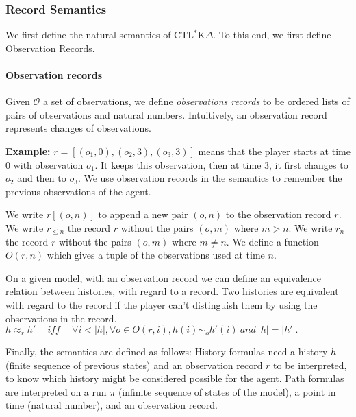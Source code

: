 \documentclass{acmart}
\def\ctlskd{CTL$^{*}$K$\Delta$}
\def\eqh#1{\approx_{#1}}
\def\eqstate#1{\sim_{#1}}
\def\iff{\ \mathit{iff}\ }
\begin{document}
\subsubsection{Record Semantics}
We first define the natural semantics of \ctlskd. To this end, we first define Observation Records.

\paragraph{Observation records}
Given $\mathcal{O}$ a set of observations, we define \textit{observations records} to be ordered lists of pairs of observations and natural numbers.
Intuitively, an observation record represents changes of observations.

\textbf{Example:}  $r=[(o_1,0),(o_2,3),(o_3,3)]$ means that the player starts at time 0 with observation $o_1$. It keeps this observation, then at time 3, it first changes to $o_2$ and then to $o_3$. We use observation records in the semantics to remember the previous observations of the agent.

We write $r[(o,n)]$ to append a new pair $(o,n)$ to the observation record $r$.
We write $r_{\leq n}$ the record $r$ without the pairs $(o,m)$ where $m>n$.
We write $r_n$ the record $r$ without the pairs $(o,m)$ where $m\neq n$. 
We define a function $\mathit{O}(r,n)$ which gives a tuple of the observations used at time $n$. 

On a given model, with an observation record we can define an equivalence relation between histories, with regard to a record. Two histories are equivalent with regard to the record if the player can't distinguish them by using the observations in the record.\\
$h\eqh{r}h'\quad\iff\quad \forall i< |h|, \forall o\in \mathit{O}(r,i), h(i)\eqstate{o} h'(i)~\textit{and}~|h|=|h'|.$


Finally, the semantics are defined as follows:
History formulas need a history $h$ (finite sequence of previous states) and an observation record $r$ to be interpreted, to know which history might be considered possible for the agent.
Path formulas are interpreted on a run $\pi$ (infinite sequence of states of the model), a point in time (natural number), and an observation record.
\end{document}
